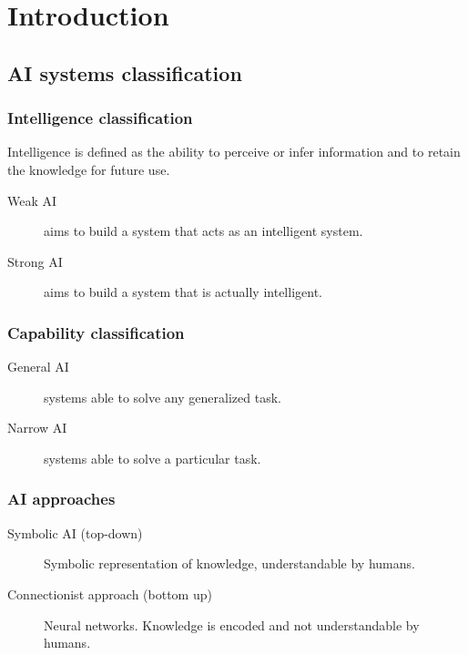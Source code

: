 \chapter{Introduction}


\section{AI systems classification}

\subsection{Intelligence classification}
Intelligence is defined as the ability to perceive or infer information and to retain the knowledge for future use.

\begin{description}
    \item[Weak AI] 
        aims to build a system that acts as an intelligent system. 
    
        \item[Strong AI] 
        aims to build a system that is actually intelligent. 
\end{description}


\subsection{Capability classification}
\begin{description}
    \item[General AI] 
        systems able to solve any generalized task. 
    
        \item[Narrow AI] 
        systems able to solve a particular task. 
\end{description}


\subsection{AI approaches}
\begin{description}
    \item[Symbolic AI (top-down)] 
        Symbolic representation of knowledge, understandable by humans.

    \item[Connectionist approach (bottom up)] 
        Neural networks. Knowledge is encoded and not understandable by humans.
\end{description}



